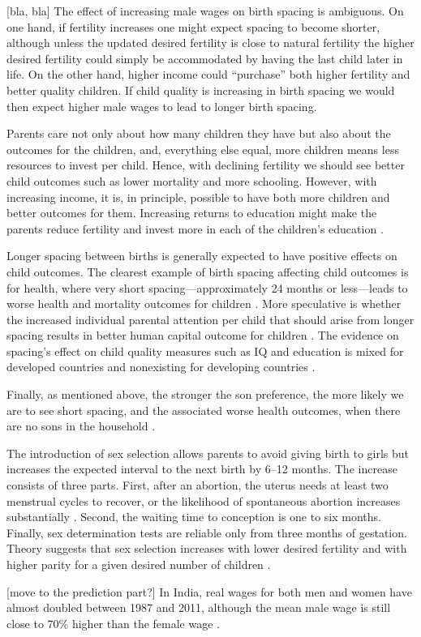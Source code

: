 [bla, bla]
The effect of increasing male wages on birth spacing is ambiguous.
On one hand, if fertility increases one might expect spacing to become shorter, although 
unless the updated desired fertility is close to natural fertility the higher desired 
fertility could simply be accommodated by having the last child later in life.
On the other hand, higher income could ``purchase'' both higher fertility and 
better quality children.
If child quality is increasing in birth spacing we would then expect higher male wages
to lead to longer birth spacing.


Parents care not only about how many children they have but also about the outcomes
for the children, and, everything else equal, more children means less resources to invest 
per child.
Hence, with declining fertility we should see better child outcomes such as lower 
mortality and more schooling.
However, with increasing income, it is, in principle, possible to have both more
children and better outcomes for them.
Increasing returns to education might make the parents reduce fertility and invest 
more in each of the children's education \citep{Rosenzweig1982a}.

Longer spacing between births is generally expected to have positive effects on 
child outcomes.
The clearest example of birth spacing affecting child outcomes is for health,
where very short spacing---approximately 24 months or less---leads to worse health 
and mortality outcomes for children 
\citep{Whitworth2002,Conde-Agudelo2006,Conde-Agudelo2012,Molitoris2019}.
More speculative is whether the increased individual parental attention per child that 
should arise from longer spacing results in better human capital outcome for children 
\citep{Zajonc1975,Zajonc1976,Razin1980}.
The evidence on spacing's effect on child quality measures such as IQ and education is 
mixed for developed countries and nonexisting for developing countries
\citep{Powell1993,Pettersson-Lidbom2009,Buckles2012,Barclay2017}.


Finally, as mentioned above, the stronger the son preference, the more likely we are to
see short spacing, and the associated worse health outcomes, when there are no sons 
in the household 
\citep{Whitworth2002,Bhalotra2008,Maitra2008,Jayachandran2011,Jayachandran2017a}.

The introduction of sex selection allows parents to avoid giving birth to girls but 
increases the expected interval to the next birth by 6--12 months.
The increase consists of three parts. 
First, after an abortion, the uterus needs at least two menstrual cycles to recover, 
or the likelihood of spontaneous abortion increases substantially \citep{zhou00b}. 
Second, the waiting time to conception is one to six months. 
Finally, sex determination tests are reliable only from three months of gestation. 
Theory suggests that sex selection increases with lower desired fertility and with
higher parity for a given desired number of children \citep{Portner2015b}.



[move to the prediction part?]
In India, real wages for both men and women have almost doubled between 1987 and 
2011, although the mean male wage is still close to 70\% higher than the female wage 
\citep{Klasen2015,Bhargava2018}.






